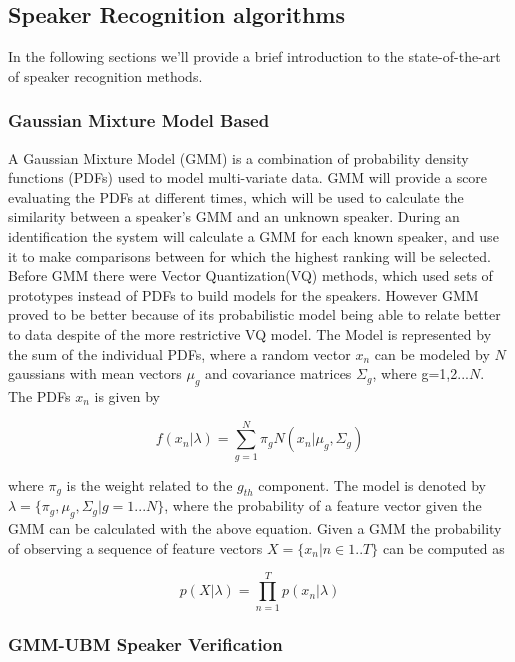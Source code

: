 \subsection{Speaker Recognition algorithms}
\label{speakeralg}
In the following sections we'll provide a brief introduction
to the state-of-the-art of speaker recognition methods.

\subsubsection{Gaussian Mixture Model Based}

A Gaussian Mixture Model (GMM) is a combination of probability
density functions (PDFs) used to model multi-variate data.\cite{speaker-recognition}
GMM will provide a score evaluating the PDFs at different times, which
will be used to calculate the similarity between a speaker's GMM and an
unknown speaker. During an identification the system will calculate
a GMM for each known speaker, and use it to make comparisons between
for which the highest ranking will be selected.\\
Before GMM there were Vector Quantization(VQ) methods, which used
sets of prototypes instead of PDFs to build models for the speakers.
However GMM proved to be better because of its probabilistic model being
able to relate better to data despite of the more restrictive VQ model.
The Model is represented by the sum of the individual PDFs, where a random
vector $x_{n}$ can be modeled by $N$ gaussians with mean vectors $\mu_{g}$ and
covariance matrices $\Sigma_{g}$, where g=1,2...$N$. The PDFs $x_{n}$ is given by

\begin{equation}
    f(x_{n}|\lambda) = {\sum_{g=1}^N \pi_{g}N(x_{n}| \mu_{g}, \Sigma_{g})}
\end{equation}

where $\pi_{g}$ is the weight related to the $g_{th}$ component. The model
is denoted by $\lambda = \{ \pi_{g}, \mu_{g},\Sigma_{g}| g=1...N\}$, where the
probability of a feature vector given the GMM can be calculated with the above equation.
Given a GMM the probability of observing a sequence of feature vectors $X=\{x_{n}| n \in 1..T\}$
can be computed as

\begin{equation}
    p(X | \lambda) = {\prod_{n=1}^Tp(x_{n}| \lambda)}
\end{equation}


\subsubsection{GMM-UBM Speaker Verification}

